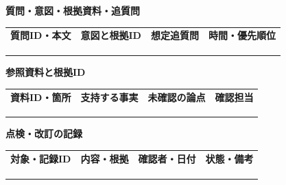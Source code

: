 \documentclass[11pt,a4paper]{article}
\begin{document}
\par{}\noindent\textbf{質問・意図・根拠資料・追質問}\par\vspace{1mm}
{\fontsize{8.5}{13}\selectfont
\begin{tabularx}{\linewidth}{@{}XXXX@{}}
\textbf{質問ID・本文} & \textbf{意図と根拠ID} & \textbf{想定追質問} & \textbf{時間・優先順位}\\[2mm]
\strut & \strut & \strut & \strut\\[5mm]
\strut & \strut & \strut & \strut\\[5mm]
\strut & \strut & \strut & \strut\\[5mm]
\end{tabularx}
}\vspace{2mm}\par
{}
\par{}\noindent\textbf{参照資料と根拠ID}\par\vspace{1mm}
{\fontsize{8.5}{13}\selectfont
\begin{tabularx}{\linewidth}{@{}XXXX@{}}
\textbf{資料ID・箇所} & \textbf{支持する事実} & \textbf{未確認の論点} & \textbf{確認担当}\\[2mm]
\strut & \strut & \strut & \strut\\[5mm]
\strut & \strut & \strut & \strut\\[5mm]
\strut & \strut & \strut & \strut\\[5mm]
\end{tabularx}
}\vspace{2mm}\par
{}
\par{}\noindent\textbf{点検・改訂の記録}\par\vspace{1mm}
{\fontsize{8.5}{13}\selectfont
\begin{tabularx}{\linewidth}{@{}XXXX@{}}
\textbf{対象・記録ID} & \textbf{内容・根拠} & \textbf{確認者・日付} & \textbf{状態・備考}\\[2mm]
\strut & \strut & \strut & \strut\\[5mm]
\strut & \strut & \strut & \strut\\[5mm]
\strut & \strut & \strut & \strut\\[5mm]
\end{tabularx}
}\vspace{2mm}\par
\end{document}
